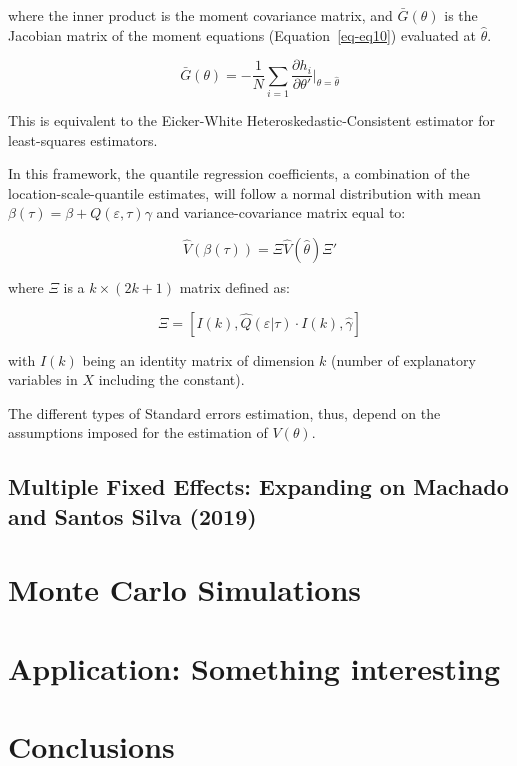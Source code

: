 \documentclass[
  letterpaper,
  DIV=11,
  numbers=noendperiod]{scrartcl}
\begin{document}
where the inner product is the moment covariance matrix, and
\(\bar{G}(\theta)\) is the Jacobian matrix of the moment equations
(Equation~\ref{eq-eq10}) evaluated at \(\hat\theta\).

\[\bar{G}(\theta) =-\frac{1}{N} \sum_{i=1} \frac{\partial h_i}{\partial \theta'} \Big|_{\theta=\hat\theta}\]

This is equivalent to the Eicker-White Heteroskedastic-Consistent
estimator for least-squares estimators.

In this framework, the quantile regression coefficients, a combination
of the location-scale-quantile estimates, will follow a normal
distribution with mean \(\beta(\tau) = \beta+Q(\varepsilon,\tau)\gamma\)
and variance-covariance matrix equal to:

\[\hat{V}(\beta(\tau)) = \Xi \hat{V}(\hat\theta) \Xi'
\]

where \(\Xi\) is a \(k \times (2k+1)\) matrix defined as:

\[\Xi = [ I(k), \hat Q(\varepsilon|\tau) \cdot I(k), \hat \gamma ]
\]

with \(I(k)\) being an identity matrix of dimension \(k\) (number of
explanatory variables in \(X\) including the constant).

The different types of Standard errors estimation, thus, depend on the
assumptions imposed for the estimation of \(V(\theta)\).

\hypertarget{multiple-fixed-effects-expanding-on-mss2019}{%
\subsection{Multiple Fixed Effects: Expanding on Machado and Santos
Silva (2019)}\label{multiple-fixed-effects-expanding-on-mss2019}}

\hypertarget{monte-carlo-simulations}{%
\section{Monte Carlo Simulations}\label{monte-carlo-simulations}}

\hypertarget{application-something-interesting}{%
\section{\texorpdfstring{Application: \textbf{Something
interesting}}{Application: Something interesting}}\label{application-something-interesting}}

\hypertarget{conclusions}{%
\section{Conclusions}\label{conclusions}}
\end{document}
